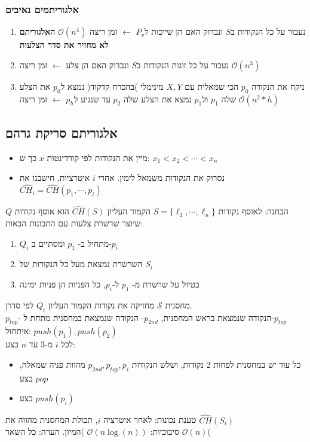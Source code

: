 \documentclass{article}
\makeatletter
\newcommand*{\saved@uline}{}
\let\saved@uline\uline
\newcommand*{\mathuline}{%
  \mathpalette{\math@uline\saved@uline}%
}
\newcommand*{\math@uline}[3]{%
  \mbox{#1{$#2#3\m@th$}}%
}
\renewcommand*{\uline}{%
  \relax  
  \ifmmode
    \expandafter\mathuline
  \else
    \expandafter\saved@uline
  \fi
}
\makeatother
\begin{document}
\subsubsection{אלגוריתמים נאיבים}
\begin{enumerate}
\item נעבור על כל הנקודות ב$S$ ונבדוק האם הן שייכות ל$P_v$ $\leftarrow$ זמן ריצה $\mathcal{O}(n^4)$ \textbf{האלגוריתם לא מחזיר את סדר הצלעות}
\item נעבור על כל זוגות הנקודות ב$S$ ונבדוק האם הן צלע $\leftarrow$ זמן ריצה $\mathcal{O}(n^3)$
\item ניקח את הנקודה $p_0$ הכי שמאלית עם $X,Y$ מינימלי )בהכרח קדקוד( נמצא ל$p_0$ את הצלע שלה $p_1$ ול$p_1$ נמצא את הצלע שלה $p_2$ עד שנגיע ל$p_h$ $\leftarrow$ זמן ריצה $\mathcal{O}(n^2*h)$ 
\end{enumerate}


\subsection{אלגוריתם סריקת גרהם}
\begin{itemize}
\item מיין את הנקודות לפי קורדינטות  $x$ כך ש: $x_1 < x_2 < \cdots < x_n$
\item נסרוק את הנקודות משמאל לימין. אחרי $i$ איטרציות, חישבנו את $\hat{CH_i}= \hat{CH}(p_1, \cdots, p_i)$
\end{itemize}
\uline{הבחנה:} לאוסף נקודות $S=\{\ell_1, \cdots, \ell_n \}$ הקמור העליון $\hat{CH}(S)$ הוא אוסף נקודות $Q$ שיוצר שרשרת צלעות עם התכונות הבאות:
\begin{enumerate}
\item $Q_i$ מתחיל ב- $p_1$ ומסתיים ב-$p_i$
\item השרשרת נמצאת מעל כל הנקודות של $S_i$
\item בטיול על שרשרת מ- $p_1$ ל-$p_i$, כל הפניות הן פניות ימינה
\end{enumerate}
מחסנית $\mathcal{S}$ מחזיקה את נקודות הקמור העליון $Q_i$ לפי סדרן.\\ $p_{top}$- הנקודה שנמצאת בראש המחסנית, $p_{2nd}$- הנקודה שנמצאת במחסנית מתחת ל-$p_{top}$\\
\uline{איתחול:} $push(p_1), push(p_2)$\\
\uline{לכל $i$ מ-3 עד $n$ בצע:}
\begin{itemize}
\item 
כל עוד יש במחסנית לפחות 2 נקודות, ושלש הנקודות $p_{2nd}, p_{top}, p_i$ מהוות פניה שמאלה, בצע $pop$
\item בצע $push(p_i)$
\end{itemize}
\uline{טענת נכונות:} לאחר איטרציה $i$, תכולת המחסנית מהווה את $\hat{CH}(S_i)$\\
\uline{סיבוכיות:} $\mathcal{O}(n \log(n))$ )המיון. הערה: כל השאר $\mathcal{O}(n)$(\\
\end{document}
